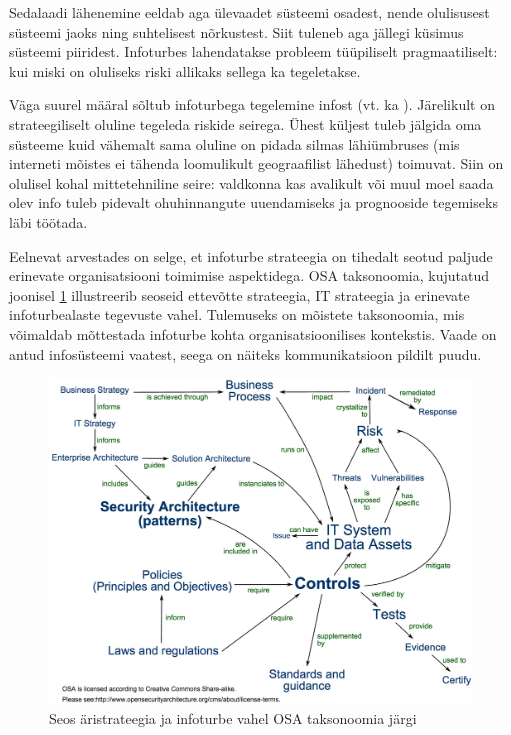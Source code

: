 Sedalaadi lähenemine eeldab aga ülevaadet süsteemi osadest, nende olulisusest süsteemi jaoks ning suhtelisest nõrkustest. Siit tuleneb aga jällegi küsimus süsteemi piiridest. Infoturbes lahendatakse probleem tüüpiliselt pragmaatiliselt: kui miski on oluliseks riski allikaks sellega ka tegeletakse.

Väga suurel määral sõltub infoturbega tegelemine infost (vt. ka ). Järelikult on strateegiliselt oluline tegeleda riskide seirega. Ühest küljest tuleb jälgida oma süsteeme kuid vähemalt sama oluline on pidada silmas lähiümbruses (mis interneti mõistes ei tähenda loomulikult geograafilist lähedust) toimuvat. Siin on olulisel kohal mittetehniline seire: valdkonna kas avalikult või muul moel saada olev info tuleb pidevalt ohuhinnangute uuendamiseks ja prognooside tegemiseks läbi töötada. 

Eelnevat arvestades on selge, et infoturbe strateegia on tihedalt seotud paljude erinevate organisatsiooni toimimise aspektidega. OSA taksonoomia, kujutatud joonisel \ref{fig:osa} illustreerib seoseid ettevõtte strateegia, IT strateegia ja erinevate infoturbealaste tegevuste vahel. Tulemuseks on mõistete taksonoomia, mis võimaldab mõttestada infoturbe kohta organisatsioonilises kontekstis. Vaade on antud infosüsteemi vaatest, seega on näiteks kommunikatsioon pildilt puudu. 

\begin{figure}[h]
	\includegraphics[width=\linewidth]{osa.png}%
	\caption{Seos äristrateegia ja infoturbe vahel OSA taksonoomia järgi} 
	\label{fig:osa}
\end{figure}


